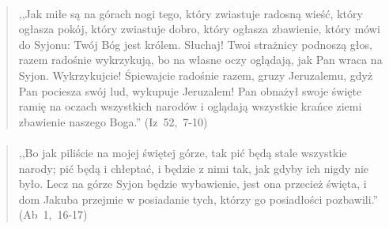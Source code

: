 \documentclass[10pt,a4paper,oneside]{article}
\begin{document}
\paragraph{}
\begin{quote}
,,Jak miłe są na górach nogi tego, który zwiastuje radosną wieść, który ogłasza pokój, który zwiastuje dobro, który ogłasza zbawienie, który mówi do Syjonu: Twój Bóg jest królem. Słuchaj! Twoi strażnicy podnoszą głos, razem radośnie wykrzykują, bo na własne oczy oglądają, jak Pan wraca na Syjon. Wykrzykujcie! Śpiewajcie radośnie razem, gruzy Jeruzalemu, gdyż Pan pociesza swój lud, wykupuje Jeruzalem! Pan obnażył swoje święte ramię na oczach wszystkich narodów i oglądają wszystkie krańce ziemi zbawienie naszego Boga.'' \mbox{(Iz 52, 7-10)}
\end{quote}
\paragraph{}
\begin{quote}
,,Bo jak piliście na mojej świętej górze, tak pić będą stale wszystkie narody; pić będą i chłeptać, i będzie z nimi tak, jak gdyby ich nigdy nie było. Lecz na górze Syjon będzie wybawienie, jest ona przecież święta, i dom Jakuba przejmie w posiadanie tych, którzy go posiadłości pozbawili.'' \mbox{(Ab 1, 16-17)}
\end{quote}
\end{document}
